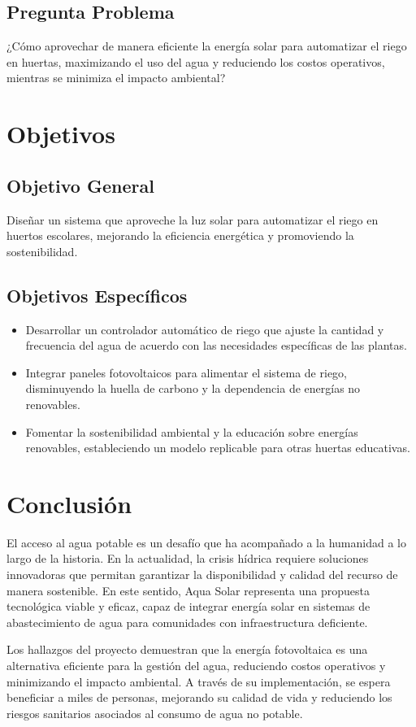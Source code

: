 \documentclass[12pt]{article}
\begin{document}
\subsection{Pregunta Problema}
¿Cómo aprovechar de manera eficiente la energía solar para automatizar el riego en huertas, maximizando el uso del agua y reduciendo los costos operativos, mientras se minimiza el impacto ambiental?
\newpage
\section{Objetivos}
\subsection{Objetivo General}
Diseñar un sistema que aproveche la luz solar para automatizar el riego en huertos escolares, mejorando la eficiencia energética y promoviendo la sostenibilidad.


\subsection{Objetivos Específicos}
\begin{itemize}
    \item Desarrollar un controlador automático de riego que ajuste la cantidad y frecuencia del agua de acuerdo con las necesidades específicas de las plantas.
    \item Integrar paneles fotovoltaicos para alimentar el sistema de riego, disminuyendo la huella de carbono y la dependencia de energías no renovables.
    \item Fomentar la sostenibilidad ambiental y la educación sobre energías renovables, estableciendo un modelo replicable para otras huertas educativas.
\end{itemize}

\newpage
\section{Conclusión}
El acceso al agua potable es un desafío que ha acompañado a la humanidad a lo largo de la historia. En la actualidad, la crisis hídrica requiere soluciones innovadoras que permitan garantizar la disponibilidad y calidad del recurso de manera sostenible. En este sentido, Aqua Solar representa una propuesta tecnológica viable y eficaz, capaz de integrar energía solar en sistemas de abastecimiento de agua para comunidades con infraestructura deficiente.

Los hallazgos del proyecto demuestran que la energía fotovoltaica es una alternativa eficiente para la gestión del agua, reduciendo costos operativos y minimizando el impacto ambiental. A través de su implementación, se espera beneficiar a miles de personas, mejorando su calidad de vida y reduciendo los riesgos sanitarios asociados al consumo de agua no potable.
\end{document}
